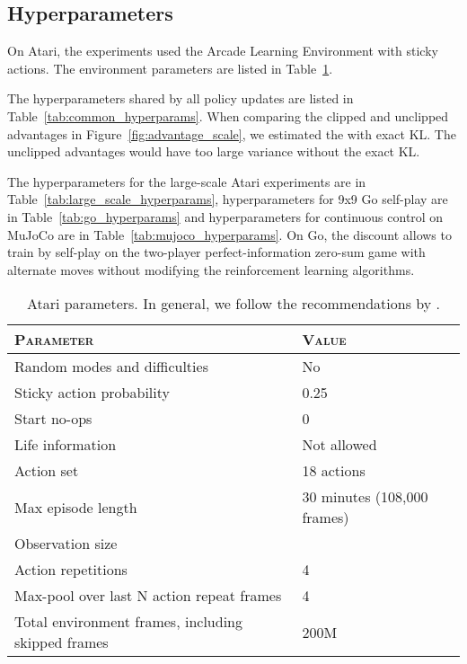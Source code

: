 \documentclass{article}
\begin{document}
\subsection{Hyperparameters}
On Atari, the experiments used the Arcade Learning Environment \cite{bellemare2013arcade} with sticky actions. The environment parameters are listed in Table~\ref{tab:atari_hyperparams}.

The hyperparameters shared by all policy updates are listed in Table~\ref{tab:common_hyperparams}.
When comparing the clipped and unclipped advantages in Figure~\ref{fig:advantage_scale}, we estimated the  with exact KL. The unclipped advantages would have too large variance without the exact KL.

The hyperparameters for the large-scale Atari experiments are in Table~\ref{tab:large_scale_hyperparams}, hyperparameters for 9x9 Go self-play are in Table~\ref{tab:go_hyperparams} and hyperparameters for continuous control on MuJoCo are in Table~\ref{tab:mujoco_hyperparams}. On Go, the discount  allows to train by self-play on the two-player perfect-information zero-sum game with alternate moves without modifying the reinforcement learning algorithms.

\begin{table}[ht]
\caption{Atari parameters. In general, we follow the recommendations  by \citet{machado2018revisiting}.}
\label{tab:atari_hyperparams}
\begin{center}
\begin{small}
\begin{tabular}{ll}
\toprule
\textsc{Parameter} & \textsc{Value} \\
\midrule
  Random modes and difficulties & No \\
  Sticky action probability  &  0.25 \\
  Start no-ops & 0 \\ 
  Life information &  Not allowed \\
  Action set & 18 actions \\
  Max episode length & 30 minutes (108,000 frames) \\
  Observation size &  \\
  Action repetitions & 4 \\
  Max-pool over last N action repeat frames & 4 \\
  Total environment frames, including skipped frames & 200M \\
\bottomrule
\end{tabular}
\end{small}
\end{center}
\vskip -0.1in
\end{table}  
\end{document}
